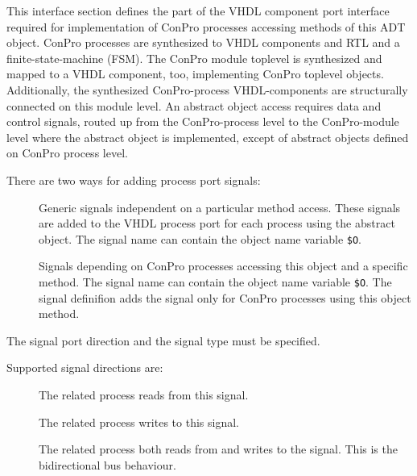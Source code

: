 \documentclass[a4paper,12pt,twoside,english]{article}
\begin{document}
\begin{description}
This interface section defines the part of the VHDL component port interface required for implementation of ConPro processes accessing methods of this ADT
object. ConPro processes are synthesized to VHDL components and RTL and a finite-state-machine (FSM). The ConPro module toplevel is synthesized and mapped to a
VHDL  component, too, implementing ConPro toplevel objects. Additionally, the synthesized ConPro-process VHDL-components are structurally connected on this
module level. An abstract object access requires data and control signals, routed up from the ConPro-process level to the ConPro-module level where the abstract
object is implemented, except of abstract objects defined on ConPro process level.

There are two ways for adding process port signals:


\begin{description}
\item[] $ $\\
Generic signals independent on a particular method access. These signals are added to the VHDL process port for each process using the abstract object.  The
signal name can contain  the object name variable {\tt \$O}. 

\item[] $ $\\
Signals depending  on ConPro processes accessing this object and a specific method. The signal name can contain  the object name variable {\tt \$O}. The signal
definifion adds  the signal only  for  ConPro processes  using this object method. 


\end{description}
The signal port direction and the signal type must be specified. 

Supported signal directions are:


\begin{description}
\item[] $ $\\
The related process  reads from this signal.

\item[] $ $\\
The related process writes to this signal. 

\item[] $ $\\
The related process both reads from and writes to the signal. This is the bidirectional bus behaviour.



\end{description}
\end{description}
\end{document}
